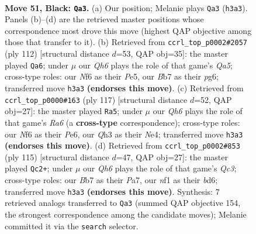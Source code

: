 \documentclass[11pt]{article}
\begin{document}
\clearpage

\begin{figure}[p]\centering
\begin{subfigure}{0.46\textwidth}\centering
\resizebox{\linewidth}{!}{%
\newchessgame
\chessboard[
  setfen={8/1b3pk1/5np1/8/3R3P/7q/4R2P/5NK1 b - - 10 51},
  showmover=false,
  pgfstyle=straightmove, color=movearrow, markmove={h3-a3}
]}
\caption{}
\end{subfigure}\hfill
\begin{subfigure}{0.46\textwidth}\centering
\resizebox{\linewidth}{!}{%
\newchessgame
\chessboard[
  setfen={6k1/3r1p2/6p1/Q2nP2p/1p5P/6PK/8/8 w - - 3 57},
  showmover=false,
  pgfstyle=straightmove, color=movearrow, markmove={a5-a6}
]}
\caption{}
\end{subfigure}
\\[4pt]
\begin{subfigure}{0.46\textwidth}\centering
\resizebox{\linewidth}{!}{%
\newchessgame
\chessboard[
  setfen={3R4/6pk/4p2p/8/4n3/r2N2PP/5PK1/8 b - - 31 59},
  showmover=false,
  pgfstyle=straightmove, color=movearrow, markmove={a3-a5}
]}
\caption{}
\end{subfigure}\hfill
\begin{subfigure}{0.46\textwidth}\centering
\resizebox{\linewidth}{!}{%
\newchessgame
\chessboard[
  setfen={6k1/p1P2pp1/2qB4/6p1/8/3R1P1P/5K2/8 b - - 2 58},
  showmover=false,
  pgfstyle=straightmove, color=movearrow, markmove={c6-c2}
]}
\caption{}
\end{subfigure}
\caption{\textbf{Move 51, Black: \texttt{Qa3}.} (a) Our position; Melanie plays \texttt{Qa3} (\texttt{h3a3}). Panels (b)--(d) are the retrieved master positions whose correspondence most drove this move (highest QAP objective among those that transfer to it). (b) Retrieved from \texttt{ccrl\_top\_p0002\#2057} (ply 112) [structural distance $d$=53, QAP obj=35]: the master played \texttt{Qa6}; under $\mu$ our \emph{Qh6} plays the role of that game's \emph{Qa5}; cross-type roles: our \emph{N}f6 as their \emph{P}e5, our \emph{B}b7 as their \emph{p}g6; transferred move \texttt{h3a3} \textbf{(endorses this move)}. (c) Retrieved from \texttt{ccrl\_top\_p0000\#163} (ply 117) [structural distance $d$=52, QAP obj=27]: the master played \texttt{Ra5}; under $\mu$ our \emph{Qh6} plays the role of that game's \emph{Ra6} (a \textbf{cross-type} correspondence); cross-type roles: our \emph{N}f6 as their \emph{P}e6, our \emph{Q}h3 as their \emph{N}e4; transferred move \texttt{h3a3} \textbf{(endorses this move)}. (d) Retrieved from \texttt{ccrl\_top\_p0002\#853} (ply 115) [structural distance $d$=47, QAP obj=27]: the master played \texttt{Qc2+}; under $\mu$ our \emph{Qh6} plays the role of that game's \emph{Qc3}; cross-type roles: our \emph{B}b7 as their \emph{P}a7, our \emph{n}f1 as their \emph{b}d6; transferred move \texttt{h3a3} \textbf{(endorses this move)}. Synthesis: 7 retrieved analogs transferred to \texttt{Qa3} (summed QAP objective 154, the strongest correspondence among the candidate moves); Melanie committed it via the \texttt{search} selector.}
\label{fig:thought-m101}
\end{figure}
\end{document}
